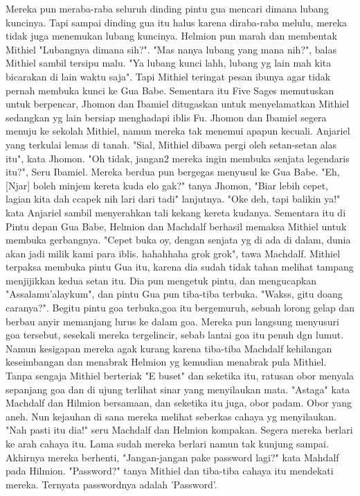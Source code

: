 \documentclass[a4paper,11pt,final]{article}
\begin{document}
Mereka pun meraba-raba seluruh dinding pintu gua mencari dimana lubang kuncinya. Tapi sampai dinding gua itu halus karena diraba-raba melulu, mereka tidak juga menemukan lubang kuncinya. Helmion pun marah dan membentak Mithiel "Lubangnya dimana sih?".
"Mas nanya lubang yang mana nih?", balas Mithiel sambil tersipu malu. "Ya lubang kunci lahh, lubang yg lain mah kita bicarakan di lain waktu saja". Tapi Mithiel teringat pesan ibunya agar tidak pernah membuka kunci ke Gua Babe.
Sementara itu Five Sages memutuskan untuk berpencar, Jhomon dan Ibamiel ditugaskan untuk menyelamatkan Mithiel sedangkan yg lain bersiap menghadapi iblis Fu. Jhomon dan Ibamiel segera menuju ke sekolah Mithiel, namun mereka tak menemui apapun kecuali.
Anjariel yang terkulai lemas di tanah. "Sial, Mithiel dibawa pergi oleh setan-setan alas itu", kata Jhomon. "Oh tidak, jangan2 mereka ingin membuka senjata legendaris itu?", Seru Ibamiel. Mereka berdua pun bergegas menyusul ke Gua Babe.
"Eh, [Njar] boleh minjem kereta kuda elo gak?" tanya Jhomon, "Biar lebih cepet, lagian kita dah ccapek nih lari dari tadi" lanjutnya. "Oke deh, tapi balikin ya!" kata Anjariel sambil menyerahkan tali kekang kereta kudanya.
Sementara itu di Pintu depan Gua Babe, Helmion dan Machdalf berhasil memaksa Mithiel untuk membuka gerbangnya. "Cepet buka oy, dengan senjata yg di ada di dalam, dunia akan jadi milik kami para iblis. hahahhaha grok grok", tawa Machdalf.
Mithiel terpaksa membuka pintu Gua itu, karena dia sudah tidak tahan melihat tampang menjijikkan kedua setan itu. Dia pun mengetuk pintu, dan mengucapkan "Assalamu'alaykum", dan pintu Gua pun tiba-tiba terbuka. "Wakss, gitu doang caranya?".
Begitu pintu goa terbuka,goa itu bergemuruh, sebuah lorong gelap dan berbau anyir memanjang lurus ke dalam goa.
Mereka pun langsung menyusuri goa tersebut, sesekali mereka tergelincir, sebab lantai goa itu penuh dgn lumut. Namun kesigapan mereka agak kurang karena tiba-tiba Machdalf kehilangan keseimbangan dan menabrak Helmion yg kemudian menabrak pula Mithiel.
Tanpa sengaja Mithiel berteriak "E buset" dan seketika itu, ratusan obor menyala sepanjang goa dan di ujung terlihat sinar yang menyilaukan mata. "Astaga" kata Machdalf dan Hilmion bersamaan, dan seketika itu juga, obor padam. Obor yang aneh.
Nun kejauhan di sana mereka melihat seberkas cahaya yg menyilaukan. "Nah pasti itu dia!" seru Machdalf dan Helmion kompakan. Segera mereka berlari ke arah cahaya itu.
Lama sudah mereka berlari namun tak kunjung sampai. Akhirnya mereka berhenti, "Jangan-jangan pake password lagi?" kata Mahdalf pada Hilmion. "Password?" tanya Mithiel dan tiba-tiba cahaya itu mendekati mereka. Ternyata passwordnya adalah 'Password'.
\end{document}
